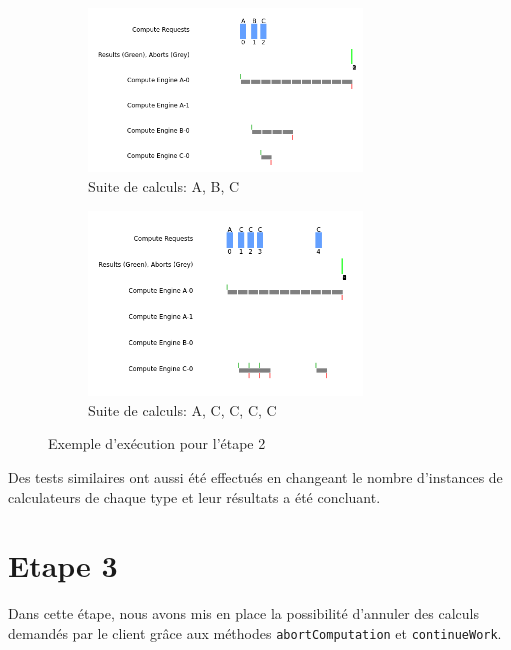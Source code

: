 \documentclass{article}
\begin{document}
\begin{figure}[h]
    \begin{subfigure}{0.45\textwidth}
        \centering
        \includegraphics[width=0.8\textwidth]{figures/A_B_C}
        \caption{Suite de calculs: A, B, C}
    \end{subfigure}
    \begin{subfigure}{0.45\textwidth}
        \centering
        \includegraphics[width=0.8\textwidth]{figures/A_C_C_C_C}
        \caption{Suite de calculs: A, C, C, C, C}
    \end{subfigure}
    \caption{Exemple d'exécution pour l'étape 2}
    \label{fig:full2}
\end{figure}

Des tests similaires ont aussi été effectués en changeant le nombre d'instances de calculateurs de chaque type et leur
résultats a été concluant.

\pagebreak

\section{Etape 3}
Dans cette étape, nous avons mis en place la possibilité d’annuler des calculs demandés par le client grâce aux méthodes
\texttt{abortComputation} et \texttt{continueWork}.
\end{document}
